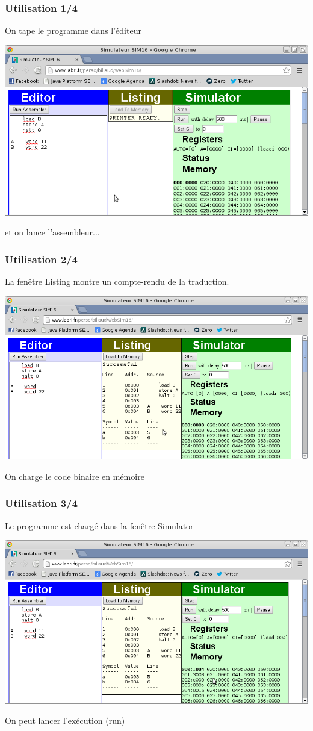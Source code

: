 \begin{frame}
  \frametitle{Utilisation 1/4}

On  tape le programme dans l'\alert{éditeur}

\includegraphics[width=\linewidth]{images/cap1.png}

et on lance l'assembleur...
\end{frame}
\begin{frame}
  \frametitle{Utilisation 2/4}

La fenêtre \alert{Listing} montre un compte-rendu de la traduction.

\includegraphics[width=\linewidth]{images/cap2.png}

On charge le code binaire en mémoire
\end{frame}

\begin{frame}
  \frametitle{Utilisation 3/4}

Le programme est chargé dans la fenêtre \alert{Simulator}

\includegraphics[width=\linewidth]{images/cap3.png}

On peut lancer l'exécution (run)
\end{frame}

